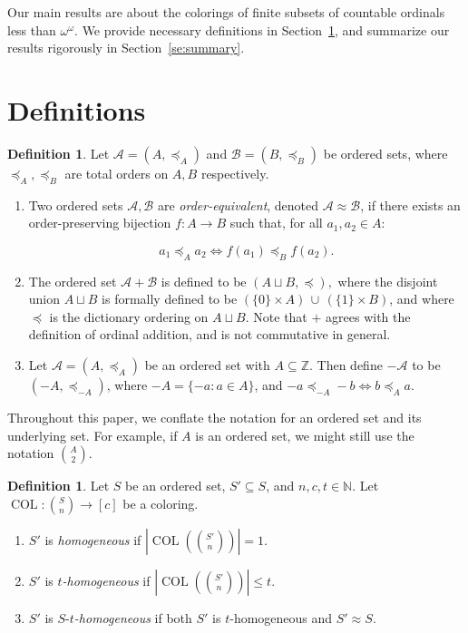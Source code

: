 \documentclass[11pt]{article}
\newcommand{\oequiv}{\approx}
\newcommand{\setconcat}{+}
\newcommand{\COL}{\operatorname{COL}}
\newcommand{\N}{\mathbb{N}}
\newcommand{\Z}{\mathbb{Z}}
\newcommand{\numpoints}{n}
\newcommand{\numcolors}{c}
\theoremstyle{plain}
\theoremstyle{definition}
\newtheorem{definition}[theorem]{Definition}
\begin{document}
Our main results are about the colorings of finite subsets of countable ordinals less than $\omega^\omega$. 
We provide necessary definitions in Section~\ref{se:defs},
and summarize our results rigorously in Section~\ref{se:summary}. 

\section{Definitions}\label{se:defs}


\begin{definition} 
Let $\mathcal{A} = (A,\preceq_A)$ and $\mathcal{B} = (B,\preceq_B)$ be ordered sets, where
$\preceq_A, \preceq_B$ are total orders on $A, B$ respectively.

\begin{enumerate}

\item Two ordered sets
$\mathcal{A},\mathcal{B}$ are \textit{order-equivalent}, denoted $\mathcal{A}\oequiv \mathcal{B}$, 
if there exists an order-preserving bijection $f\colon A \to B$ such that, for all $a_1, a_2 \in A$: 

$$a_1 \preceq_A a_2 \iff f(a_1) \preceq_B f(a_2).$$

\item 
The ordered set $\mathcal{A} \setconcat \mathcal{B}$ is defined to be
$(A\sqcup B, \preceq),$ where the disjoint union $A\sqcup B$ is formally defined to be
$(\{0\} \times A) \, \cup\, (\{1\} \times B)$, and where $\preceq$ is the dictionary ordering on $A\sqcup B.$
Note that $\setconcat$ agrees with the definition of ordinal addition, and is not commutative in general.

\item 
Let $\mathcal{A}=(A,\preceq_A)$ be an ordered set with $A \subseteq \Z$. Then define $-\mathcal{A}$ to be $(-A,\preceq_{-A})$, where 
$-A = \{ -a \colon a \in A\}$, and
$-a \preceq_{-A} -b \iff b \preceq_{A} a$.
\end{enumerate} 

\end{definition} 

Throughout this paper, we conflate the notation for an ordered set and its underlying set. 
For example, if $A$ is an ordered set, we might still use the notation $\binom{A}{2}$.

\begin{definition}\label{def:homogeneous}
Let $S$ be an ordered set, $S'\subseteq S$, and $\numpoints,\numcolors,t \in \N.$ Let $\COL \colon \binom{S}{\numpoints} \to [\numcolors]$ be a coloring.
\begin{enumerate}
    \item 
$S'$ is \textit{homogeneous} if  $\left|\COL\left(\binom{S'}{\numpoints}\right)\right|= 1$. 
\item 
 $S'$ is \textit{$t$-homogeneous} if $\left|\COL\left(\binom{S'}{\numpoints}\right)\right|\leq t$. 
 \item 
$S'$ is $S$-\textit{$t$-homogeneous} if both $S'$ is $t$-homogeneous and $S'\oequiv S$.
\end{enumerate}
\end{definition}
\end{document}
